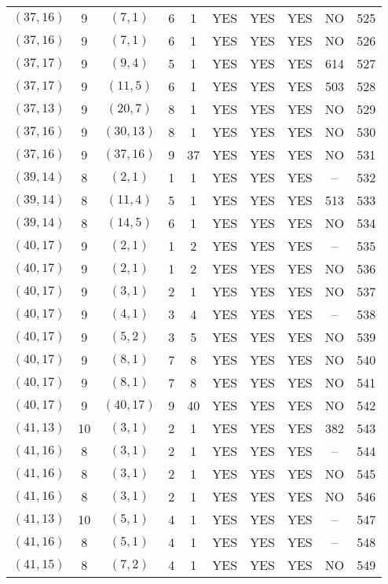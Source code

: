 \begin{longtable}{|c|c|c|c|c|c|c|c|c|c|}
$(37, 16)$ & 9 & $(7, 1)$ & 6 & 1 & YES & YES & YES & NO & 525\\
$(37, 16)$ & 9 & $(7, 1)$ & 6 & 1 & YES & YES & YES & NO & 526\\
$(37, 17)$ & 9 & $(9, 4)$ & 5 & 1 & YES & YES & YES & 614 & 527\\
$(37, 17)$ & 9 & $(11, 5)$ & 6 & 1 & YES & YES & YES & 503 & 528\\
$(37, 13)$ & 9 & $(20, 7)$ & 8 & 1 & YES & YES & YES & NO & 529\\
$(37, 16)$ & 9 & $(30, 13)$ & 8 & 1 & YES & YES & YES & NO & 530\\
$(37, 16)$ & 9 & $(37, 16)$ & 9 & 37 & YES & YES & YES & NO & 531\\
$(39, 14)$ & 8 & $(2, 1)$ & 1 & 1 & YES & YES & YES & -- & 532\\
$(39, 14)$ & 8 & $(11, 4)$ & 5 & 1 & YES & YES & YES & 513 & 533\\
$(39, 14)$ & 8 & $(14, 5)$ & 6 & 1 & YES & YES & YES & NO & 534\\
$(40, 17)$ & 9 & $(2, 1)$ & 1 & 2 & YES & YES & YES & -- & 535\\
$(40, 17)$ & 9 & $(2, 1)$ & 1 & 2 & YES & YES & YES & NO & 536\\
$(40, 17)$ & 9 & $(3, 1)$ & 2 & 1 & YES & YES & YES & NO & 537\\
$(40, 17)$ & 9 & $(4, 1)$ & 3 & 4 & YES & YES & YES & -- & 538\\
$(40, 17)$ & 9 & $(5, 2)$ & 3 & 5 & YES & YES & YES & NO & 539\\
$(40, 17)$ & 9 & $(8, 1)$ & 7 & 8 & YES & YES & YES & NO & 540\\
$(40, 17)$ & 9 & $(8, 1)$ & 7 & 8 & YES & YES & YES & NO & 541\\
$(40, 17)$ & 9 & $(40, 17)$ & 9 & 40 & YES & YES & YES & NO & 542\\
$(41, 13)$ & 10 & $(3, 1)$ & 2 & 1 & YES & YES & YES & 382 & 543\\
$(41, 16)$ & 8 & $(3, 1)$ & 2 & 1 & YES & YES & YES & -- & 544\\
$(41, 16)$ & 8 & $(3, 1)$ & 2 & 1 & YES & YES & YES & NO & 545\\
$(41, 16)$ & 8 & $(3, 1)$ & 2 & 1 & YES & YES & YES & NO & 546\\
$(41, 13)$ & 10 & $(5, 1)$ & 4 & 1 & YES & YES & YES & -- & 547\\
$(41, 16)$ & 8 & $(5, 1)$ & 4 & 1 & YES & YES & YES & -- & 548\\
$(41, 15)$ & 8 & $(7, 2)$ & 4 & 1 & YES & YES & YES & NO & 549\\

\end{longtable}
